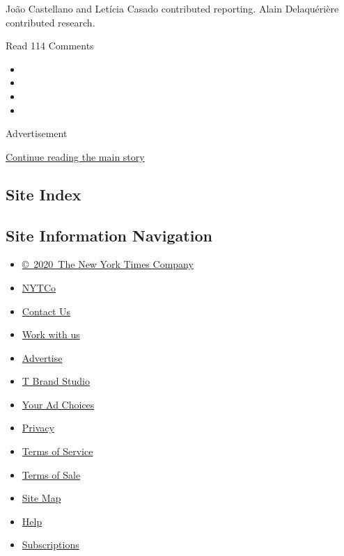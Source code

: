 João Castellano and Letícia Casado contributed reporting. Alain
Delaquérière contributed research.

Read 114 Comments

\begin{itemize}
\item
\item
\item
\item
\end{itemize}

Advertisement

\protect\hyperlink{after-bottom}{Continue reading the main story}

\hypertarget{site-index}{%
\subsection{Site Index}\label{site-index}}

\hypertarget{site-information-navigation}{%
\subsection{Site Information
Navigation}\label{site-information-navigation}}

\begin{itemize}
\tightlist
\item
  \href{https://help.nytimes3xbfgragh.onion/hc/en-us/articles/115014792127-Copyright-notice}{©~2020~The
  New York Times Company}
\end{itemize}

\begin{itemize}
\tightlist
\item
  \href{https://www.nytco.com/}{NYTCo}
\item
  \href{https://help.nytimes3xbfgragh.onion/hc/en-us/articles/115015385887-Contact-Us}{Contact
  Us}
\item
  \href{https://www.nytco.com/careers/}{Work with us}
\item
  \href{https://nytmediakit.com/}{Advertise}
\item
  \href{http://www.tbrandstudio.com/}{T Brand Studio}
\item
  \href{https://www.nytimes3xbfgragh.onion/privacy/cookie-policy\#how-do-i-manage-trackers}{Your
  Ad Choices}
\item
  \href{https://www.nytimes3xbfgragh.onion/privacy}{Privacy}
\item
  \href{https://help.nytimes3xbfgragh.onion/hc/en-us/articles/115014893428-Terms-of-service}{Terms
  of Service}
\item
  \href{https://help.nytimes3xbfgragh.onion/hc/en-us/articles/115014893968-Terms-of-sale}{Terms
  of Sale}
\item
  \href{https://spiderbites.nytimes3xbfgragh.onion}{Site Map}
\item
  \href{https://help.nytimes3xbfgragh.onion/hc/en-us}{Help}
\item
  \href{https://www.nytimes3xbfgragh.onion/subscription?campaignId=37WXW}{Subscriptions}
\end{itemize}
